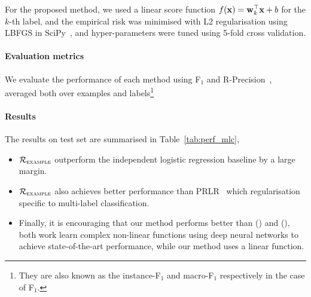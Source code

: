 For the proposed method, we used a linear score function $f(\mathbf{x}) = \mathbf{w}_k^\top \mathbf{x} + b$ for the $k$-th label,
and the empirical risk was minimised with L2 regularisation using LBFGS in SciPy~\cite{scipy,lbfgsb},
and hyper-parameters were tuned using 5-fold cross validation.

\paragraph{Evaluation metrics}
We evaluate the performance of each method using F$_1$ and R-Precision~\cite{manning2008introIR},
averaged both over examples and labels\footnote{They are also known as the instance-F$_1$ and macro-F$_1$ respectively in the case of F$_1$.}


\paragraph{Results}
The results on test set are summarised in Table~\ref{tab:perf_mlc},
\begin{itemize}
\item $\mathcal{R}_\textsc{example}$ outperform the independent logistic regression baseline by a large margin.
\item $\mathcal{R}_\textsc{example}$ also achieves better performance than PRLR~\cite{lin2014multi} which regularisation specific to multi-label classification.
\item Finally, it is encouraging that our method performs better than (\cite{belanger2016structured}) and (\cite{gygli2017deep}),
both work learn complex non-linear functions using deep neural networks to achieve state-of-the-art performance, while our method uses a linear function.
\end{itemize}

